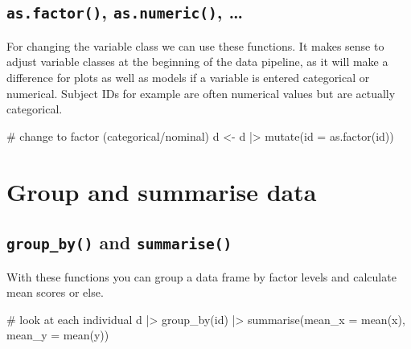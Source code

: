 \documentclass[
  letterpaper,
  DIV=11,
  numbers=noendperiod,
  oneside]{scrreprt}
\newenvironment{Shaded}{\begin{snugshade}}{\end{snugshade}}
\newcommand{\AttributeTok}[1]{\textcolor[rgb]{0.40,0.45,0.13}{#1}}
\newcommand{\CommentTok}[1]{\textcolor[rgb]{0.37,0.37,0.37}{#1}}
\newcommand{\FunctionTok}[1]{\textcolor[rgb]{0.28,0.35,0.67}{#1}}
\newcommand{\NormalTok}[1]{\textcolor[rgb]{0.00,0.23,0.31}{#1}}
\newcommand{\OtherTok}[1]{\textcolor[rgb]{0.00,0.23,0.31}{#1}}
\newcommand{\SpecialCharTok}[1]{\textcolor[rgb]{0.37,0.37,0.37}{#1}}
\begin{document}
\hypertarget{as.factor-as.numeric}{%
\subsection{\texorpdfstring{\texttt{as.factor()}, \texttt{as.numeric()},
\ldots{}}{as.factor(), as.numeric(), \ldots{}}}\label{as.factor-as.numeric}}

For changing the variable class we can use these functions. It makes
sense to adjust variable classes at the beginning of the data pipeline,
as it will make a difference for plots as well as models if a variable
is entered categorical or numerical. Subject IDs for example are often
numerical values but are actually categorical.

\begin{Shaded}
\begin{Highlighting}[]
\CommentTok{\# change to factor (categorical/nominal)}
\NormalTok{d }\OtherTok{\textless{}{-}}\NormalTok{ d }\SpecialCharTok{|\textgreater{}} 
    \FunctionTok{mutate}\NormalTok{(}\AttributeTok{id =} \FunctionTok{as.factor}\NormalTok{(id))}
\end{Highlighting}
\end{Shaded}

\hypertarget{group-and-summarise-data}{%
\section{Group and summarise data}\label{group-and-summarise-data}}

\hypertarget{group_by-and-summarise}{%
\subsection{\texorpdfstring{\texttt{group\_by()} and
\texttt{summarise()}}{group\_by() and summarise()}}\label{group_by-and-summarise}}

With these functions you can group a data frame by factor levels and
calculate mean scores or else.

\begin{Shaded}
\begin{Highlighting}[]
\CommentTok{\# look at each individual}
\NormalTok{d }\SpecialCharTok{|\textgreater{}} \FunctionTok{group\_by}\NormalTok{(id) }\SpecialCharTok{|\textgreater{}}
    \FunctionTok{summarise}\NormalTok{(}\AttributeTok{mean\_x =} \FunctionTok{mean}\NormalTok{(x),}
              \AttributeTok{mean\_y =} \FunctionTok{mean}\NormalTok{(y))}
\end{Highlighting}
\end{Shaded}
\end{document}
